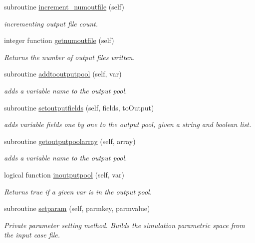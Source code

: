 \begin{DoxyCompactItemize}
subroutine \mbox{\hyperlink{namespacesimulationglobals__mod_a77d7175bc03e472ee9a00ee9f6ff1b0e}{increment\+\_\+numoutfile}} (self)
\begin{DoxyCompactList}\small\item\em incrementing output file count. \end{DoxyCompactList}\item 
integer function \mbox{\hyperlink{namespacesimulationglobals__mod_a2b76dc3e6cbf1256253c54903df8393b}{getnumoutfile}} (self)
\begin{DoxyCompactList}\small\item\em Returns the number of output files written. \end{DoxyCompactList}\item 
subroutine \mbox{\hyperlink{namespacesimulationglobals__mod_a1b94fa3858d556fc974a7ac6b18625cb}{addtooutputpool}} (self, var)
\begin{DoxyCompactList}\small\item\em adds a variable name to the output pool. \end{DoxyCompactList}\item 
subroutine \mbox{\hyperlink{namespacesimulationglobals__mod_a046b75c2e163809ea467da6340f1829c}{setoutputfields}} (self, fields, to\+Output)
\begin{DoxyCompactList}\small\item\em adds variable fields one by one to the output pool, given a string and boolean list. \end{DoxyCompactList}\item 
subroutine \mbox{\hyperlink{namespacesimulationglobals__mod_ac0323793c29be7c79a735ca766fb8a78}{getoutputpoolarray}} (self, array)
\begin{DoxyCompactList}\small\item\em adds a variable name to the output pool. \end{DoxyCompactList}\item 
logical function \mbox{\hyperlink{namespacesimulationglobals__mod_a17dc711ec02d5aea0c33006939da8dec}{inoutputpool}} (self, var)
\begin{DoxyCompactList}\small\item\em Returns true if a given var is in the output pool. \end{DoxyCompactList}\item 
subroutine \mbox{\hyperlink{namespacesimulationglobals__mod_ada0b6ffc5e112afbd86cdaa8d9aa55d8}{setparam}} (self, parmkey, parmvalue)
\begin{DoxyCompactList}\small\item\em Private parameter setting method. Builds the simulation parametric space from the input case file. \end{DoxyCompactList}\item 

\end{DoxyCompactItemize}
